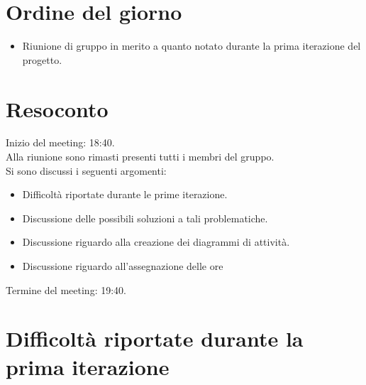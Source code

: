 \section{Ordine del giorno}

\begin{itemize}
	\item Riunione di gruppo in merito a quanto notato durante la prima iterazione del progetto.
\end{itemize}

\section{Resoconto}
\label{sec:Resoconto}

\noindent 
Inizio del meeting: 18:40. \\
\noindent Alla riunione sono rimasti presenti tutti i membri del gruppo. \\
Si sono discussi i seguenti argomenti:
\begin{itemize}
	\item Difficoltà riportate durante le prime iterazione.
	\item Discussione delle possibili soluzioni a tali problematiche.
	\item Discussione riguardo alla creazione dei diagrammi di attività.
	\item Discussione riguardo all'assegnazione delle ore
\end{itemize}

\noindent Termine del meeting: 19:40.


\section{Difficoltà riportate durante la prima iterazione}

